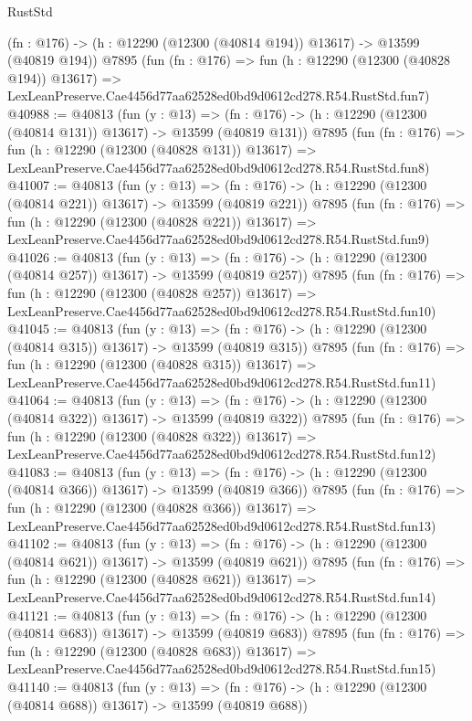 \begin{lexlean}{RustStd}
\begin{coremodule}
    (fn : @176) -> (h : @12290 (@12300 (@40814 @194)) @13617) -> @13599 (@40819 @194))
    @7895
    (fun (fn : @176) =>
    fun (h : @12290 (@12300 (@40828 @194)) @13617) =>
    LexLeanPreserve.Cae4456d77aa62528ed0bd9d0612cd278.R54.RustStd.fun7)
@40988 := @40813
    (fun (y : @13) =>
    (fn : @176) -> (h : @12290 (@12300 (@40814 @131)) @13617) -> @13599 (@40819 @131))
    @7895
    (fun (fn : @176) =>
    fun (h : @12290 (@12300 (@40828 @131)) @13617) =>
    LexLeanPreserve.Cae4456d77aa62528ed0bd9d0612cd278.R54.RustStd.fun8)
@41007 := @40813
    (fun (y : @13) =>
    (fn : @176) -> (h : @12290 (@12300 (@40814 @221)) @13617) -> @13599 (@40819 @221))
    @7895
    (fun (fn : @176) =>
    fun (h : @12290 (@12300 (@40828 @221)) @13617) =>
    LexLeanPreserve.Cae4456d77aa62528ed0bd9d0612cd278.R54.RustStd.fun9)
@41026 := @40813
    (fun (y : @13) =>
    (fn : @176) -> (h : @12290 (@12300 (@40814 @257)) @13617) -> @13599 (@40819 @257))
    @7895
    (fun (fn : @176) =>
    fun (h : @12290 (@12300 (@40828 @257)) @13617) =>
    LexLeanPreserve.Cae4456d77aa62528ed0bd9d0612cd278.R54.RustStd.fun10)
@41045 := @40813
    (fun (y : @13) =>
    (fn : @176) -> (h : @12290 (@12300 (@40814 @315)) @13617) -> @13599 (@40819 @315))
    @7895
    (fun (fn : @176) =>
    fun (h : @12290 (@12300 (@40828 @315)) @13617) =>
    LexLeanPreserve.Cae4456d77aa62528ed0bd9d0612cd278.R54.RustStd.fun11)
@41064 := @40813
    (fun (y : @13) =>
    (fn : @176) -> (h : @12290 (@12300 (@40814 @322)) @13617) -> @13599 (@40819 @322))
    @7895
    (fun (fn : @176) =>
    fun (h : @12290 (@12300 (@40828 @322)) @13617) =>
    LexLeanPreserve.Cae4456d77aa62528ed0bd9d0612cd278.R54.RustStd.fun12)
@41083 := @40813
    (fun (y : @13) =>
    (fn : @176) -> (h : @12290 (@12300 (@40814 @366)) @13617) -> @13599 (@40819 @366))
    @7895
    (fun (fn : @176) =>
    fun (h : @12290 (@12300 (@40828 @366)) @13617) =>
    LexLeanPreserve.Cae4456d77aa62528ed0bd9d0612cd278.R54.RustStd.fun13)
@41102 := @40813
    (fun (y : @13) =>
    (fn : @176) -> (h : @12290 (@12300 (@40814 @621)) @13617) -> @13599 (@40819 @621))
    @7895
    (fun (fn : @176) =>
    fun (h : @12290 (@12300 (@40828 @621)) @13617) =>
    LexLeanPreserve.Cae4456d77aa62528ed0bd9d0612cd278.R54.RustStd.fun14)
@41121 := @40813
    (fun (y : @13) =>
    (fn : @176) -> (h : @12290 (@12300 (@40814 @683)) @13617) -> @13599 (@40819 @683))
    @7895
    (fun (fn : @176) =>
    fun (h : @12290 (@12300 (@40828 @683)) @13617) =>
    LexLeanPreserve.Cae4456d77aa62528ed0bd9d0612cd278.R54.RustStd.fun15)
@41140 := @40813
    (fun (y : @13) =>
    (fn : @176) -> (h : @12290 (@12300 (@40814 @688)) @13617) -> @13599 (@40819 @688))

\end{coremodule}
\end{lexlean}
